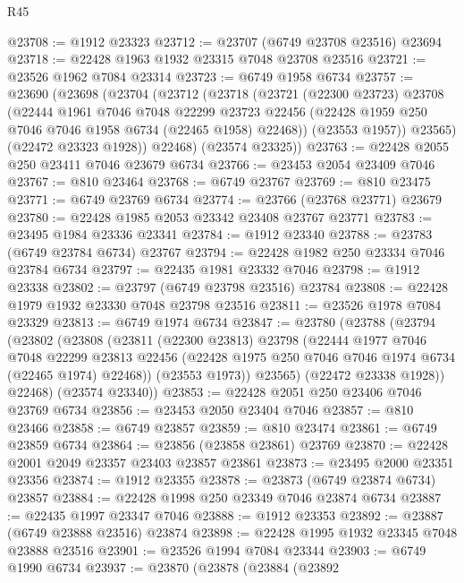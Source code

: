 \begin{lexlean}{R45}
\begin{coremodule}
{@23708 := @1912 @23323
@23712 := @23707 (@6749 @23708 @23516) @23694
@23718 := @22428 @1963 @1932 @23315 @7048 @23708 @23516
@23721 := @23526 @1962 @7084 @23314
@23723 := @6749 @1958 @6734
@23757 := @23690
    (@23698
      (@23704
        (@23712
          (@23718
            (@23721
              (@22300 @23723)
              @23708
              (@22444
                @1961
                @7046
                @7048
                @22299
                @23723
                @22456
                (@22428 @1959 @250 @7046 @7046 @1958 @6734 (@22465 @1958) @22468))
              (@23553 @1957))
            @23565)
          (@22472 @23323 @1928))
        @22468)
      (@23574 @23325))
@23763 := @22428 @2055 @250 @23411 @7046 @23679 @6734
@23766 := @23453 @2054 @23409 @7046
@23767 := @810 @23464
@23768 := @6749 @23767
@23769 := @810 @23475
@23771 := @6749 @23769 @6734
@23774 := @23766 (@23768 @23771) @23679
@23780 := @22428 @1985 @2053 @23342 @23408 @23767 @23771
@23783 := @23495 @1984 @23336 @23341
@23784 := @1912 @23340
@23788 := @23783 (@6749 @23784 @6734) @23767
@23794 := @22428 @1982 @250 @23334 @7046 @23784 @6734
@23797 := @22435 @1981 @23332 @7046
@23798 := @1912 @23338
@23802 := @23797 (@6749 @23798 @23516) @23784
@23808 := @22428 @1979 @1932 @23330 @7048 @23798 @23516
@23811 := @23526 @1978 @7084 @23329
@23813 := @6749 @1974 @6734
@23847 := @23780
    (@23788
      (@23794
        (@23802
          (@23808
            (@23811
              (@22300 @23813)
              @23798
              (@22444
                @1977
                @7046
                @7048
                @22299
                @23813
                @22456
                (@22428 @1975 @250 @7046 @7046 @1974 @6734 (@22465 @1974) @22468))
              (@23553 @1973))
            @23565)
          (@22472 @23338 @1928))
        @22468)
      (@23574 @23340))
@23853 := @22428 @2051 @250 @23406 @7046 @23769 @6734
@23856 := @23453 @2050 @23404 @7046
@23857 := @810 @23466
@23858 := @6749 @23857
@23859 := @810 @23474
@23861 := @6749 @23859 @6734
@23864 := @23856 (@23858 @23861) @23769
@23870 := @22428 @2001 @2049 @23357 @23403 @23857 @23861
@23873 := @23495 @2000 @23351 @23356
@23874 := @1912 @23355
@23878 := @23873 (@6749 @23874 @6734) @23857
@23884 := @22428 @1998 @250 @23349 @7046 @23874 @6734
@23887 := @22435 @1997 @23347 @7046
@23888 := @1912 @23353
@23892 := @23887 (@6749 @23888 @23516) @23874
@23898 := @22428 @1995 @1932 @23345 @7048 @23888 @23516
@23901 := @23526 @1994 @7084 @23344
@23903 := @6749 @1990 @6734
@23937 := @23870
    (@23878
      (@23884
        (@23892
}
\end{coremodule}
\end{lexlean}
